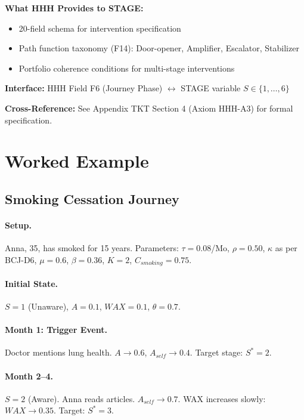\begin{tcolorbox}[colback=orange!5!white, colframe=orange!75!black,
    title=\textbf{Integration: STAGE $\leftrightarrow$ HHH (Intervention Toolkit)}]
\textbf{What HHH Provides to STAGE:}
\begin{itemize}[nosep]
\item 20-field schema for intervention specification
\item Path function taxonomy (F14): Door-opener, Amplifier, Escalator, Stabilizer
\item Portfolio coherence conditions for multi-stage interventions
\end{itemize}

\textbf{Interface:} HHH Field F6 (Journey Phase) $\leftrightarrow$ STAGE variable $S \in \{1, \ldots, 6\}$

\textbf{Cross-Reference:} See Appendix TKT Section 4 (Axiom HHH-A3) for formal specification.

\end{tcolorbox}



\section{Worked Example}
\label{sec:bcj-example}

\subsection{Smoking Cessation Journey}

\paragraph{Setup.} Anna, 35, has smoked for 15 years. Parameters: $\tau=0.08$/Mo, $\rho=0.50$, $\kappa$ as per BCJ-D6, $\mu=0.6$, $\beta=0.36$, $K=2$, $C_{smoking}=0.75$.

\paragraph{Initial State.} $S=1$ (Unaware), $A=0.1$, $WAX=0.1$, $\theta=0.7$.

\paragraph{Month 1: Trigger Event.} Doctor mentions lung health. $A \to 0.6$, $A_{self} \to 0.4$. Target stage: $S^*=2$.

\paragraph{Month 2--4.} $S=2$ (Aware). Anna reads articles. $A_{self} \to 0.7$. WAX increases slowly: $WAX \to 0.35$. Target: $S^*=3$.

